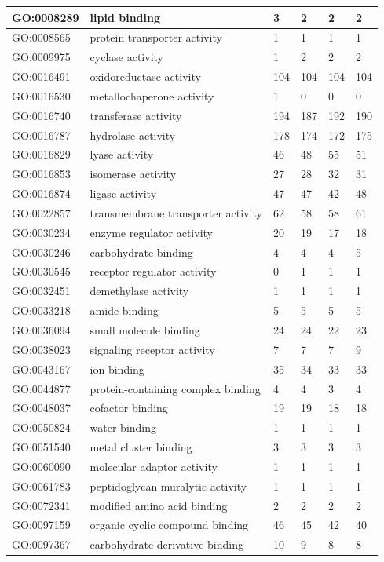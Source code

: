 \documentclass[12pt]{article}
\begin{document}
\begin{longtable}{ | p{2.2cm} | p{4cm} |p{2cm} | p{2cm} | p{2cm} | p{2cm} |}
\hline
GO:0008289&lipid binding&3&2&2&2\\
\hline
GO:0008565&protein transporter activity&1&1&1&1\\
\hline
GO:0009975&cyclase activity&1&2&2&2\\
\hline
GO:0016491&oxidoreductase activity&104&104&104&104\\
\hline
GO:0016530&metallochaperone activity&1&0&0&0\\
\hline
GO:0016740&transferase activity&194&187&192&190\\
\hline
GO:0016787&hydrolase activity&178&174&172&175\\
\hline
GO:0016829&lyase activity&46&48&55&51\\
\hline
GO:0016853&isomerase activity&27&28&32&31\\
\hline
GO:0016874&ligase activity&47&47&42&48\\
\hline
GO:0022857&transmembrane transporter activity&62&58&58&61\\
\hline
GO:0030234&enzyme regulator activity&20&19&17&18\\
\hline
GO:0030246&carbohydrate binding&4&4&4&5\\
\hline
GO:0030545&receptor regulator activity&0&1&1&1\\
\hline
GO:0032451&demethylase activity&1&1&1&1\\
\hline
GO:0033218&amide binding&5&5&5&5\\
\hline
GO:0036094&small molecule binding&24&24&22&23\\
\hline
GO:0038023&signaling receptor activity&7&7&7&9\\
\hline
GO:0043167&ion binding&35&34&33&33\\
\hline
GO:0044877&protein-containing complex binding&4&4&3&4\\
\hline
GO:0048037&cofactor binding&19&19&18&18\\
\hline
GO:0050824&water binding&1&1&1&1\\
\hline
GO:0051540&metal cluster binding&3&3&3&3\\
\hline
GO:0060090&molecular adaptor activity&1&1&1&1\\
\hline
GO:0061783&peptidoglycan muralytic activity&1&1&1&1\\
\hline
GO:0072341&modified amino acid binding&2&2&2&2\\
\hline
GO:0097159&organic cyclic compound binding&46&45&42&40\\
\hline
GO:0097367&carbohydrate derivative binding&10&9&8&8\\

\end{longtable}
\end{document}
